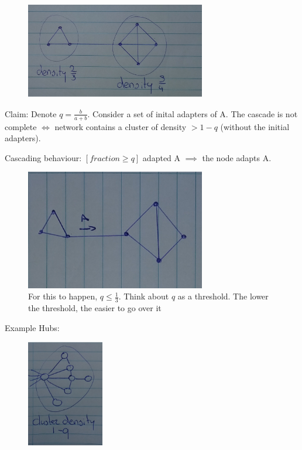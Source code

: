 \documentclass[12pt]{scrartcl}
\begin{document}
\begin{figure}[h]
	\centering
	\includegraphics[width=0.7\textwidth]{./images/fig4.jpg}
\end{figure}

Claim: Denote $q = \frac{b}{a+b}$. Consider a set of inital adapters of A. The cascade is not complete $\iff$ network contains a cluster of density $> 1-q$ (without the initial adapters).

Cascading behaviour: $[fraction \geq q]$ adapted A $\implies$ the node adapts A.

\begin{figure}[h]
	\centering
	\includegraphics[width=0.7\textwidth]{./images/fig5.jpg}
	\caption{For this to happen, $q\leq \frac{1}{3}$. Think about $q$ as a threshold. The lower the threshold, the easier to go over it}
\end{figure}
\clearpage

Example Hubs:


\begin{figure}[h]
	\centering
	\includegraphics[width=0.3\textwidth]{./images/fig6.jpg}
\end{figure}
\end{document}
